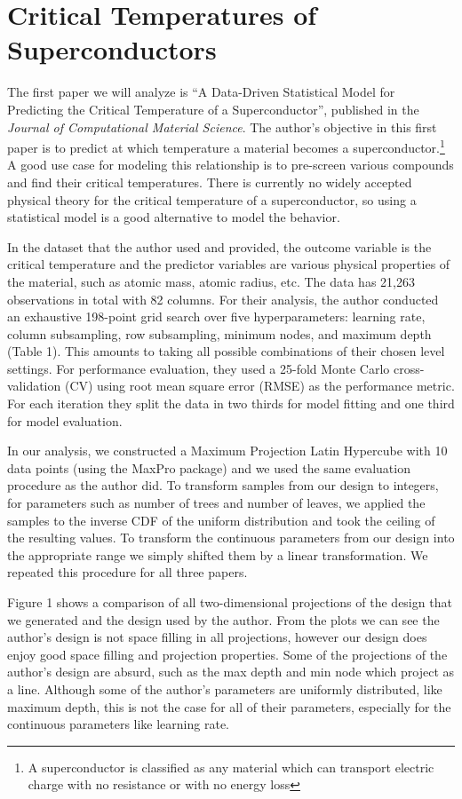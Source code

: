 \documentclass[12pt]{article}
\begin{document}
\section{Critical Temperatures of Superconductors}
The first paper we will analyze is “A Data-Driven Statistical Model for Predicting the Critical Temperature of a Superconductor”, published in the \textit{Journal of Computational Material Science}. The author's objective in this first paper is to predict at which temperature a material becomes a superconductor.\footnote{A superconductor is classified as any material which can transport electric charge with no resistance or with no energy loss} A good use case for modeling this relationship is to pre-screen various compounds and find their critical temperatures. There is currently no widely accepted physical theory for the critical temperature of a superconductor, so using a statistical model is a good alternative to model the behavior.

In the dataset that the author used and provided, the outcome variable is the critical temperature and the predictor variables are various physical properties of the material, such as atomic mass, atomic radius, etc. The data has 21,263 observations in total with 82 columns.
For their analysis, the author conducted an exhaustive 198-point grid search over five hyperparameters: learning rate, column subsampling, row subsampling, minimum nodes, and maximum depth (Table 1). This amounts to taking all possible combinations of their chosen level settings. For performance evaluation, they used a 25-fold Monte Carlo cross-validation (CV) using root mean square error (RMSE) as the performance metric. For each iteration they split the data in two thirds for model fitting and one third for model evaluation.

In our analysis, we constructed a Maximum Projection Latin Hypercube with 10 data points (using the MaxPro package) and we used the same evaluation procedure as the author did.  To transform samples from our design to integers, for parameters such as number of trees and number of leaves, we applied the samples to the inverse CDF of the uniform distribution and took the ceiling of the resulting values. To transform the continuous parameters from our design into the appropriate range we simply shifted them by a linear transformation. We repeated this procedure for all three papers.

Figure 1 shows a comparison of all two-dimensional projections of the design that we generated and the design used by the author. From the plots we can see the author's design is not space filling in all projections, however our design does enjoy good space filling and projection properties. Some of the projections of the author's design are absurd, such as the max depth and min node which project as a line. Although some of the author's parameters are uniformly distributed, like maximum depth, this is not the case for all of their parameters, especially for the continuous parameters like learning rate. 
\end{document}
